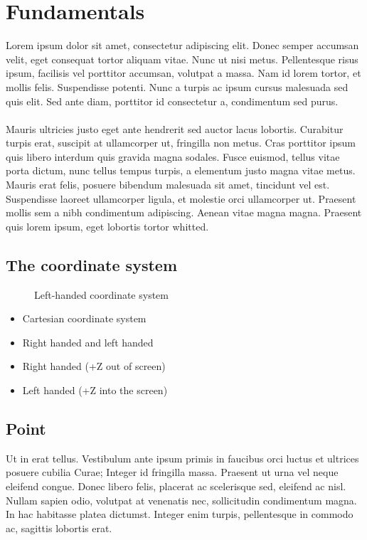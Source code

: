 \chapter{Fundamentals}
Lorem ipsum dolor sit amet, consectetur adipiscing elit. Donec semper accumsan velit, eget consequat tortor aliquam vitae. Nunc ut nisi metus. 
Pellentesque risus ipsum, facilisis vel porttitor accumsan, volutpat a massa. Nam id lorem tortor, et mollis felis. Suspendisse potenti. 
Nunc a turpis ac ipsum cursus malesuada sed quis elit. Sed ante diam, porttitor id consectetur a, condimentum sed purus. 
\\\\
Mauris ultricies justo eget ante hendrerit sed auctor lacus lobortis. Curabitur turpis erat, suscipit at ullamcorper ut, fringilla non metus. 
Cras porttitor ipsum quis libero interdum quis gravida magna sodales. Fusce euismod, tellus vitae porta dictum, nunc tellus tempus turpis, 
a elementum justo magna vitae metus. Mauris erat felis, posuere bibendum malesuada sit amet, tincidunt vel est. Suspendisse laoreet ullamcorper 
ligula, et molestie orci ullamcorper ut. Praesent mollis sem a nibh condimentum adipiscing. Aenean vitae magna magna. 
Praesent quis lorem ipsum, eget lobortis tortor whitted\cite{Whitted1979}.
\section{The coordinate system}
\begin{figure}[htbp]
\centering

\caption{Left-handed coordinate system}
\label{Left-handed cartesian coordinate system.}
\end{figure}
\begin{itemize}
\item Cartesian coordinate system
\item Right handed and left handed
\item Right handed (+Z out of screen)
\item Left handed (+Z into the screen)
\end{itemize}
\section{Point}
Ut in erat tellus. Vestibulum ante ipsum primis in faucibus orci luctus et ultrices posuere cubilia Curae; Integer id fringilla massa. Praesent ut urna vel neque eleifend congue. Donec libero felis, placerat ac scelerisque sed, eleifend ac nisl. Nullam sapien odio, volutpat at venenatis nec, sollicitudin condimentum magna. In hac habitasse platea dictumst. Integer enim turpis, pellentesque in commodo ac, sagittis lobortis erat.
